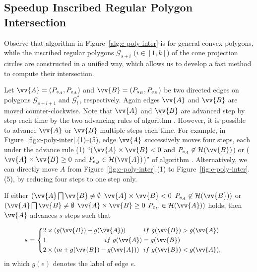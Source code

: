 \subsection{Speedup Inscribed Regular Polygon Intersection}
\label{subsec-fastRPI}


Observe that algorithm \cpia in Figure~\ref{alg:c-poly-inter} is for general convex polygons,
while the inscribed regular polygons $\mathcal{G}_{s+i}$ ($i\in[1, k]$) of the cone projection circles are constructed in a unified way,
which allows us to develop a fast method to compute their intersection.

Let $\vv{A} = (P_{s_A}, P_{e_A})$ and $\vv{B} = (P_{s_B}, P_{e_B})$  be two directed edges on polygons $\mathcal{G}_{s+l+1}$ and $\mathcal{G}^*_{l}$, respectively.
Again edges $\vv{A}$ and $\vv{B}$ are moved counter-clockwise. Note that $\vv{A}$ and $\vv{B}$ are advanced step by step each time by the two advancing rules of algorithm \cpia.
%
However, it is possible to advance $\vv{A}$ or $\vv{B}$ multiple steps each time.
%
For example, in Figure~\ref{fig:c-poly-inter}.(1)--(5), edge $\vv{A}$ successively moves four steps, each under the advance rule (1) ``($\vv{A} \times \vv{B} < 0$ and $P_{e_A} \not \in \mathcal{H}(\vv{B})$) or ($\vv{A} \times \vv{B} \ge 0$ and $P_{e_B} \in \mathcal{H}(\vv{A})$)'' of algorithm \cpia.
Alternatively, we can directly move $A$ from Figure~\ref{fig:c-poly-inter}.(1) to Figure~\ref{fig:c-poly-inter}.(5), by reducing four steps to one step only.



\begin{prop}
\label{prop-rule1}
If either $(\vv{A} \bigsqcap \vv{B} \ne \emptyset$ \And $\vv{A} \times \vv{B} < 0$ \And $P_{e_A} \not \in \mathcal{H}(\vv{B}))$ or $(\vv{A} \bigsqcap \vv{B} \ne \emptyset$ \And $\vv{A} \times \vv{B} \ge 0$ \And $P_{e_B} \in \mathcal{H}(\vv{A}))$ holds, then $\vv{A}$ advances $s$ steps such that

\vspace{-1ex}
\begin{equation*}
\label{equ-rule1}
\small
    \hspace{2ex} s =  \left\{
    \begin{aligned}
        & 2\times(g(\vv{B}) - g(\vv{A}))  \hspace{5ex}~~if  ~g(\vv{B}) > g(\vv{A}) \\
        & {1}              \hspace{21ex}~if  ~g(\vv{A}) = g(\vv{B}) \\
        & 2\times(m+g(\vv{B}) - g(\vv{A})) ~~if  ~g(\vv{B}) < g(\vv{A}), \\
    \end{aligned}
    \right.       \hspace{6ex}{}
\end{equation*}
in which $g(e)$ denotes the label of edge $e$.
\end{prop}



